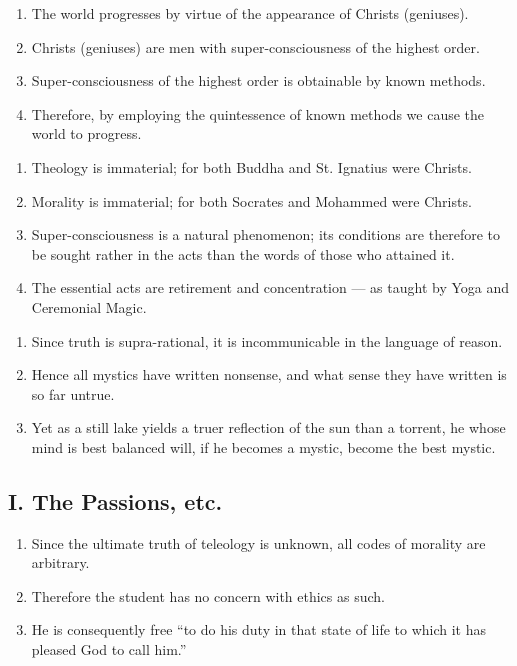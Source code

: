 

\begin{enumerate}[label=\Roman*.]
\item The world progresses by virtue of the appearance of Christs (geniuses).
\item Christs (geniuses) are men with super-consciousness of the highest order.
\item Super-consciousness of the highest order is obtainable by known methods.
\item[] Therefore, by employing the quintessence of known methods we cause the world to progress.
\end{enumerate}

\begin{enumerate}[label=\Roman*.]
\item Theology is immaterial; for both Buddha and St. Ignatius were Christs.
\item Morality is immaterial; for both Socrates and Mohammed were Christs.
\item Super-consciousness is a natural phenomenon; its conditions are therefore to be sought rather in the acts than the words of those who attained it.
\item[] The essential acts are retirement and concentration --- as taught by Yoga and Ceremonial Magic.
\end{enumerate}

\begin{enumerate}[label=\Roman*.]
\item Since truth is supra-rational, it is incommunicable in the language of reason.
\item Hence all mystics have written nonsense, and what sense they have written is so far untrue.
\item Yet as a still lake yields a truer reflection of the sun than a torrent, he whose mind is best balanced will, if he becomes a mystic, become the best mystic.
\end{enumerate}

\subsection*{I. The Passions, etc.}
\begin{enumerate}[label=\Roman*.]
\item Since the ultimate truth of teleology is unknown, all codes of morality are arbitrary.
\item Therefore the student has no concern with ethics as such.
\item He is consequently free \enquote{to do his duty in that state of life to which it has pleased God to call him.}
\end{enumerate}

